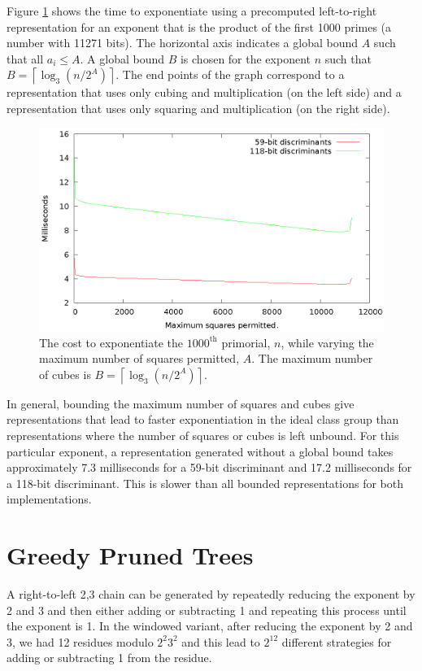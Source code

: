 \documentclass{ucalgthes1}
\theoremstyle{definition}
\newcommand{\ceil}[1]{\left\lceil #1 \right\rceil}
\begin{document}
Figure \ref{fig:dbnsL2rVaryBounds} shows the time to exponentiate using a precomputed left-to-right representation for an exponent that is the product of the first 1000 primes (a number with 11271 bits).  The horizontal axis indicates a global bound $A$ such that all $a_i \le A$.  A global bound $B$ is chosen for the exponent $n$ such that $B = \ceil{\log_3(n/2^A)}$.  The end points of the graph correspond to a representation that uses only cubing and multiplication (on the left side) and a representation that uses only squaring and multiplication (on the right side).

\begin{figure}[H]
\centering
\includegraphics{dbns_l2r_vary_max}
\caption{The cost to exponentiate the $1000^{\textrm{th}}$ primorial, $n$, while varying the maximum number of squares permitted, $A$. The maximum number of cubes is $B = \ceil{\log_3(n/2^A)}$.}
\label{fig:dbnsL2rVaryBounds}
\end{figure}

In general, bounding the maximum number of squares and cubes give representations that lead to faster exponentiation in the ideal class group than representations where the number of squares or cubes is left unbound.  For this particular exponent, a representation generated without a global bound takes approximately 7.3 milliseconds for a 59-bit discriminant and 17.2 milliseconds for a 118-bit discriminant.  This is slower than all bounded representations for both implementations.

\section{Greedy Pruned Trees}

A right-to-left 2,3 chain can be generated by repeatedly reducing the exponent by 2 and 3 and then either adding or subtracting 1 and repeating this process until the exponent is 1.  In the windowed variant, after reducing the exponent by 2 and 3, we had 12 residues modulo $2^2 3^2$ and this lead to $2^{12}$ different strategies for adding or subtracting 1 from the residue.
\end{document}
